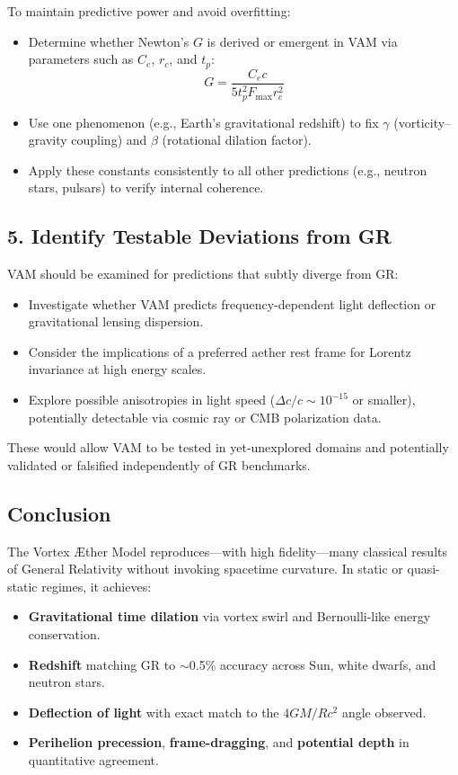 To maintain predictive power and avoid overfitting:

\begin{itemize}
    \item Determine whether Newton’s $G$ is derived or emergent in VAM via parameters such as $C_e$, $r_c$, and $t_p$:
    \begin{equation}
        G = \frac{C_e c}{5 t_p^2 F_{\max} r_c^2}
    \end{equation}
    \item Use one phenomenon (e.g., Earth’s gravitational redshift) to fix $\gamma$ (vorticity–gravity coupling) and $\beta$ (rotational dilation factor).
    \item Apply these constants consistently to all other predictions (e.g., neutron stars, pulsars) to verify internal coherence.
\end{itemize}

\subsection*{5. Identify Testable Deviations from GR}

VAM should be examined for predictions that subtly diverge from GR:

\begin{itemize}
    \item Investigate whether VAM predicts frequency-dependent light deflection or gravitational lensing dispersion.
    \item Consider the implications of a preferred aether rest frame for Lorentz invariance at high energy scales.
    \item Explore possible anisotropies in light speed ($\Delta c/c \sim 10^{-15}$ or smaller), potentially detectable via cosmic ray or CMB polarization data.
\end{itemize}

These would allow VAM to be tested in yet-unexplored domains and potentially validated or falsified independently of GR benchmarks.

\subsection*{Conclusion}

The Vortex \AE ther Model reproduces—with high fidelity—many classical results of General Relativity without invoking spacetime curvature. In static or quasi-static regimes, it achieves:

\begin{itemize}
    \item \textbf{Gravitational time dilation} via vortex swirl and Bernoulli-like energy conservation.
    \item \textbf{Redshift} matching GR to $\sim$0.5\% accuracy across Sun, white dwarfs, and neutron stars.
    \item \textbf{Deflection of light} with exact match to the $4GM/Rc^2$ angle observed.
    \item \textbf{Perihelion precession}, \textbf{frame-dragging}, and \textbf{potential depth} in quantitative agreement.
\end{itemize}

